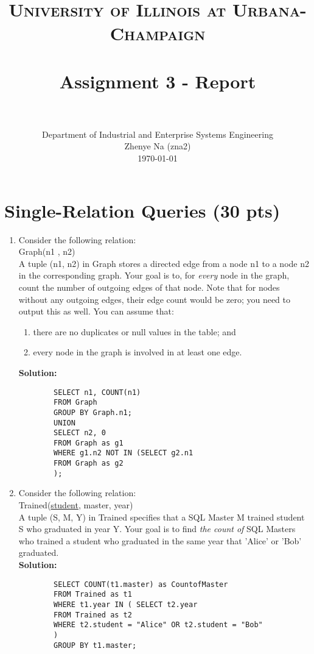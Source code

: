 \documentclass[paper=a4, fontsize=11pt]{scrartcl}
\title{
	\usefont{OT1}{bch}{b}{n}
	\normalfont \normalsize \textsc{University of Illinois at Urbana-Champaign} \\ [25pt]
	\horrule{0.5pt} \\[0.4cm]
	\huge Assignment 3 - Report \\
	\horrule{2pt} \\[0.5cm]
}
\author{
	\normalfont 								\normalsize
	Department of Industrial and Enterprise Systems Engineering\\
	\normalsize Zhenye Na (zna2)\\[-3pt]		\normalsize
	\today
}
\date{}
\numberwithin{equation}{section}		%
\numberwithin{figure}{section}			%
\numberwithin{table}{section}				%
\begin{document}
	\maketitle
	
	\section{Single-Relation Queries (30 pts)}
	
	\begin{enumerate}
		\item Consider the following relation:\\
		Graph(n1 , n2)\\
		A tuple (n1, n2) in Graph stores a directed edge from a node n1 to a node n2 in the corresponding graph. Your goal is to, for \textit{every} node in the graph, count the number of outgoing edges of that node. Note that for nodes without any outgoing edges, their edge count would be zero; you need to output this as well.
		You can assume that:
		\begin{enumerate}
			\item there are no duplicates or null values in the table; and
			\item every node in the graph is involved in at least one edge.
		\end{enumerate}
		
		\textbf{Solution: }
		\begin{lstlisting}
		SELECT n1, COUNT(n1)
		FROM Graph
		GROUP BY Graph.n1;
		UNION
		SELECT n2, 0
		FROM Graph as g1
		WHERE g1.n2 NOT IN (SELECT g2.n1
		FROM Graph as g2     
		);
		\end{lstlisting}
		
		
		\item Consider the following relation:\\
		Trained(\underline{student}, master, year)\\
		A tuple (S, M, Y) in Trained specifies that a SQL Master M trained student S who graduated in year Y. Your goal is to find \textit{the count of} SQL Masters who trained a student who graduated in the same year that 'Alice' or 'Bob' graduated.\\
		\textbf{Solution: }
		\begin{lstlisting}
		SELECT COUNT(t1.master) as CountofMaster
		FROM Trained as t1
		WHERE t1.year IN ( SELECT t2.year
		FROM Trained as t2
		WHERE t2.student = "Alice" OR t2.student = "Bob"
		)
		GROUP BY t1.master;
		\end{lstlisting}
		

\end{enumerate}
\end{document}
